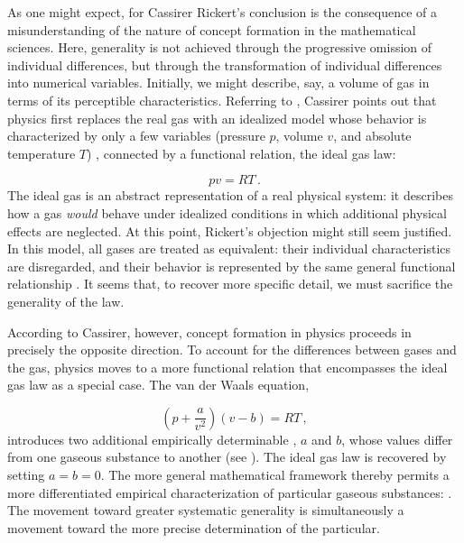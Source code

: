 \documentclass[submitted,12pt]{article}
\renewcommand{\SF}[2]{\citep[#1/#2]{Cassirer1910}}
\renewcommand{\DI}[2]{\citep[#1/#2]{Cassirer1936}}
\begin{document}
 As one might expect, for Cassirer Rickert's conclusion is the consequence of a misunderstanding of the nature of concept formation in the mathematical sciences. Here, generality is not achieved through the progressive omission of individual differences, but through the transformation of individual differences into numerical variables. Initially, we might describe, say, a volume of gas in terms of its perceptible characteristics. Referring to \citet{Duhem1906}, Cassirer points out that physics first replaces the real gas with an idealized model whose behavior is characterized by only a few variables (pressure $p$, volume $v$, and absolute temperature $T$) \SF{189--90}{143--44}, connected by a functional relation, the ideal gas law:  

\begin{equation*}
pv=RT\,.  
\end{equation*}
%
The ideal gas is an abstract representation of a real physical system: it describes how a gas \emph{would} behave under idealized conditions in which additional physical effects are neglected. At this point, Rickert's objection might still seem justified. In this model, all gases are treated as equivalent: their individual characteristics are disregarded, and their behavior is represented by the same general functional relationship \SF{304}{228}. It seems that, to recover more specific detail, we must sacrifice the generality of the law.


According to Cassirer, however, concept formation in physics proceeds in precisely the opposite direction. To account for the differences between  gases and the  gas, physics moves to a more  functional relation that encompasses the ideal gas law as a special case. The van der Waals equation, 

\begin{equation*}
\left(p+\frac{a}{v^2}\right)(v-b)=RT\,,
\end{equation*}
%
introduces two additional empirically determinable  , $a$ and $b$, whose values differ from one gaseous substance to another (see \DI{107--07}{85--86}). The ideal gas law is recovered by setting $a=b=0$. The more general mathematical framework thereby permits a more differentiated empirical characterization of particular gaseous substances:  \SF{306--7}{231}. The movement toward greater systematic generality is simultaneously a movement toward the more precise determination of the particular.
\end{document}
